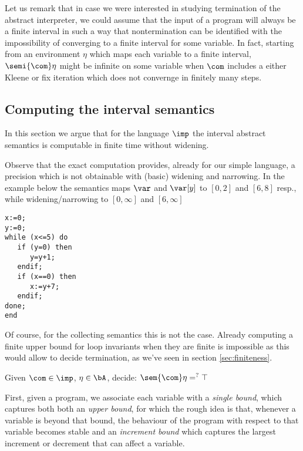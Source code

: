 \begin{remark}
  Let us remark that in case we were interested in studying
  termination of the abstract interpreter, we could assume that the
  input of a program will always be a finite interval in such a way
  that nontermination can be identified with the impossibility of
  converging to a finite interval for some variable. In fact, starting
  from an environment \(\eta\) which maps each variable to a finite
  interval, \(\semi{\com}\eta\) might be infinite on some variable
  when \(\com\) includes a either Kleene or fix iteration which does
  not convernge in finitely many steps.
\end{remark}

\subsection{Computing the interval semantics} 

In this section we argue that for the language \(\imp\) the interval
abstract semantics is computable in finite time without widening.

Observe that the exact computation provides, already for our simple
language, a precision which is not obtainable with (basic) widening
and narrowing. In the example below the semantics maps \(\var\) and
\(\var[y]\) to \([0,2]\) and \([6,8]\) resp., while widening/narrowing
to \([0,\infty]\) and \([6,\infty]\)

\begin{verbatim}
x:=0;
y:=0;
while (x<=5) do
   if (y=0) then
      y=y+1;
   endif;
   if (x==0) then
      x:=y+7;
   endif;
done;
end
\end{verbatim}

Of course, for the collecting semantics this is not the case. Already
computing a finite upper bound for loop invariants when they are
finite is impossible as this would allow to decide termination, as
we've seen in section \ref{sec:finiteness}.

\begin{problem}\label{problem1}
Given \(\com\in \imp\), \(\eta \in \bA\), decide: \(\sem{\com} \eta
=^? \top\)
\end{problem}

First, given a program, we associate each variable with a \emph{single
bound}, which captures both both an \emph{upper bound}, for which the
rough idea is that, whenever a variable is beyond that bound, the
behaviour of the program with respect to that variable becomes stable
and an \emph{increment bound} which captures the largest increment or
decrement that can affect a variable.

